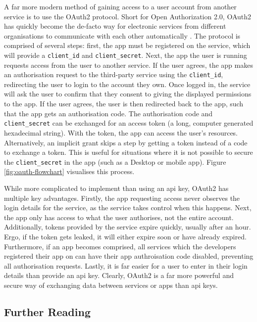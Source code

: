 \documentclass[11pt]{article}
\begin{document}
A far more modern method of gaining access to a \gls{user} account from another service is to use the OAuth2 protocol. Short for Open Authorization 2.0, OAuth2 has quickly become the de-facto way for electronic services from different organisations to communicate with each other automatically \cite{oauth2}. The protocol is comprised of several steps: first, the app must be registered on the service, which will provide a \texttt{client\_id} and \texttt{client\_secret}. Next, the app the user is running \gls{request}s access from the user to another service. If the user agrees, the app makes an authorisation \gls{request} to the third-party service using the \texttt{client\_id}, redirecting the user to login to the account they own. Once logged in, the service will ask the user to confirm that they consent to giving the displayed permissions to the app. If the user agrees, the user is then redirected back to the app, such that the app gets an authorisation code. The authorisation code and \texttt{client\_secret} can be exchanged for an access \gls{token} (a long, computer generated hexadecimal string). With the \gls{token}, the app can access the user's resources. Alternatively, an implicit grant skips a step by getting a \gls{token} instead of a code to exchange a \gls{token}. This is useful for situations where it is not possible to secure the \texttt{client\_secret} in the app (such as a Desktop or mobile app). Figure \ref{fig:oauth-flowchart} visualises this process.

While more complicated to implement than using an \acrshort{api} key, OAuth2 has multiple key advantages. Firstly, the app \gls{request}ing access never observes the login details for the service, as the service takes control when this happens. Next, the app only has access to what the \gls{user} authorises, not the entire account. Additionally, \gls{token}s provided by the service expire quickly, usually after an hour. Ergo, if the \gls{token} gets leaked, it will either expire soon or have already expired. Furthermore, if an app becomes comprised, all services which the developers registered their app on can have their app authroisation code disabled, preventing all authorisation \gls{request}s. Lastly, it is far easier for a user to enter in their login details than provide an \acrshort{api} key. Clearly, OAuth2 is a far more powerful and secure way of exchanging data between services or apps than \acrshort{api} keys.

\subsection{Further Reading}
\end{document}
